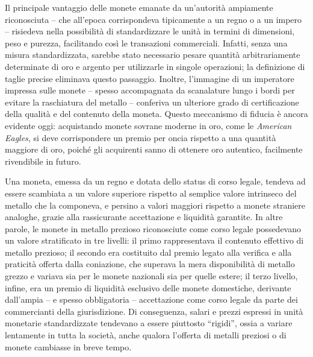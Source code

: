 \documentclass[
  a5paper,
  smalldemyvopaper,10pt,twoside,onecolumn,openright,extrafontsizes,hidelinks]{memoir}
\begin{document}
Il principale vantaggio delle monete emanate da un'autorità ampiamente
riconosciuta -- che all'epoca corrispondeva tipicamente a un regno o a
un impero -- risiedeva nella possibilità di standardizzare le unità in
termini di dimensioni, peso e purezza, facilitando così le transazioni
commerciali. Infatti, senza una misura standardizzata, sarebbe stato
necessario pesare quantità arbitrariamente determinate di oro e argento
per utilizzarle in singole operazioni; la definizione di taglie precise
eliminava questo passaggio. Inoltre, l'immagine di un imperatore
impressa sulle monete -- spesso accompagnata da scanalature lungo i
bordi per evitare la raschiatura del metallo -- conferiva un ulteriore
grado di certificazione della qualità e del contenuto della moneta.
Questo meccanismo di fiducia è ancora evidente oggi: acquistando monete
sovrane moderne in oro, come le \emph{American Eagles}, si deve
corrispondere un premio per oncia rispetto a una quantità maggiore di
oro, poiché gli acquirenti sanno di ottenere oro autentico, facilmente
rivendibile in futuro.

Una moneta, emessa da un regno e dotata dello status di corso legale,
tendeva ad essere scambiata a un valore superiore rispetto al semplice
valore intrinseco del metallo che la componeva, e persino a valori
maggiori rispetto a monete straniere analoghe, grazie alla rassicurante
accettazione e liquidità garantite. In altre parole, le monete in
metallo prezioso riconosciute come corso legale possedevano un valore
stratificato in tre livelli: il primo rappresentava il contenuto
effettivo di metallo prezioso; il secondo era costituito dal premio
legato alla verifica e alla praticità offerta dalla coniazione, che
superava la mera disponibilità di metallo grezzo e variava sia per le
monete nazionali sia per quelle estere; il terzo livello, infine, era un
premio di liquidità esclusivo delle monete domestiche, derivante
dall'ampia -- e spesso obbligatoria -- accettazione come corso legale da
parte dei commercianti della giurisdizione. Di conseguenza, salari e
prezzi espressi in unità monetarie standardizzate tendevano a essere
piuttosto ``rigidi'', ossia a variare lentamente in tutta la società,
anche qualora l'offerta di metalli preziosi o di monete cambiasse in
breve tempo.
\end{document}
